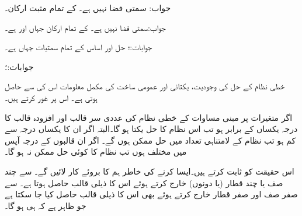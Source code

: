 جواب: سمتی فضا نہیں ہے۔
 کے تمام  مثبت ارکان۔

جواب:سمتی فضا نہیں ہے۔
 کے تمام ارکان جہاں  اور  ہے۔

جوابات:؛ حل  اور اساس 
 کے تمام سمتیات جہاں  ہے۔

جوابات:؛ 

خطی نظام کے حل کی وجودیت، یکتائی اور عمومی ساخت کی مکمل معلومات اس کی  سے حاصل ہوتی ہے۔ اس پر غور کرتے ہیں۔

اگر  متغیرات پر مبنی مساوات کے خطی نظام کی عددی سر قالب اور افزودہ قالب کا درجہ یکساں  کے برابر ہو تب اس نظام کا حل یکتا ہو گا۔البتہ اگر ان کا یکساں درجہ  سے کم ہو تب نظام کے لامتناہی تعداد میں حل ممکن ہوں گے۔ اگر ان قالبوں کے درجہ آپس میں مختلف ہوں تب نظام کا کوئی حل ممکن نہ ہو گا۔

اس حقیقت کو ثابت کرتے ہیں۔ایسا کرنے کی خاطر ہم  کا  بروئے کار لائیں گے۔ سے چند صف یا چند قطار (یا دونوں) خارج کرتے ہوئے اس کا ذیلی قالب حاصل ہوتا ہے۔  سے صفر صف اور صفر قطار خارج کرتے ہوئے بھی اس کا ذیلی قالب حاصل کیا جا سکتا ہے جو ظاہر ہے کہ  ہی ہو گا۔

